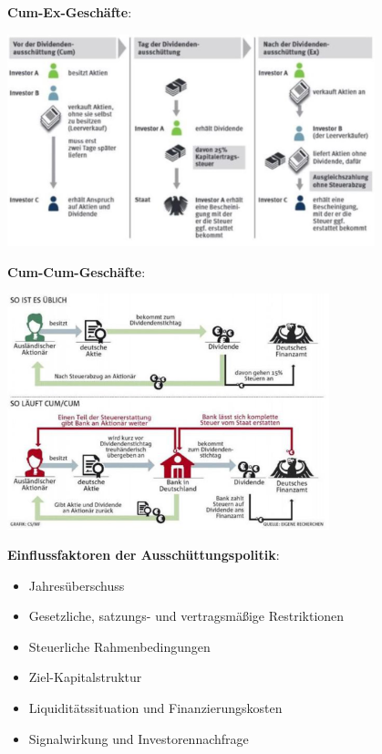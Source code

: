 \textbf{Cum-Ex-Geschäfte}:
\begin{center}
	\includegraphics[width=0.8\textwidth]{images/cum-ex.png}
\end{center}
\pagebreak
\textbf{Cum-Cum-Geschäfte}:
\begin{center}
	\includegraphics[width=0.7\textwidth]{images/cum-cum.png}
\end{center}
\bigskip
\textbf{Einflussfaktoren der Ausschüttungspolitik}:
\begin{itemize}
	\item Jahresüberschuss
	\item Gesetzliche, satzungs- und vertragsmäßige Restriktionen
	\item Steuerliche Rahmenbedingungen
	\item Ziel-Kapitalstruktur
	\item Liquiditätssituation und Finanzierungskosten
	\item Signalwirkung und Investorennachfrage
\end{itemize}
